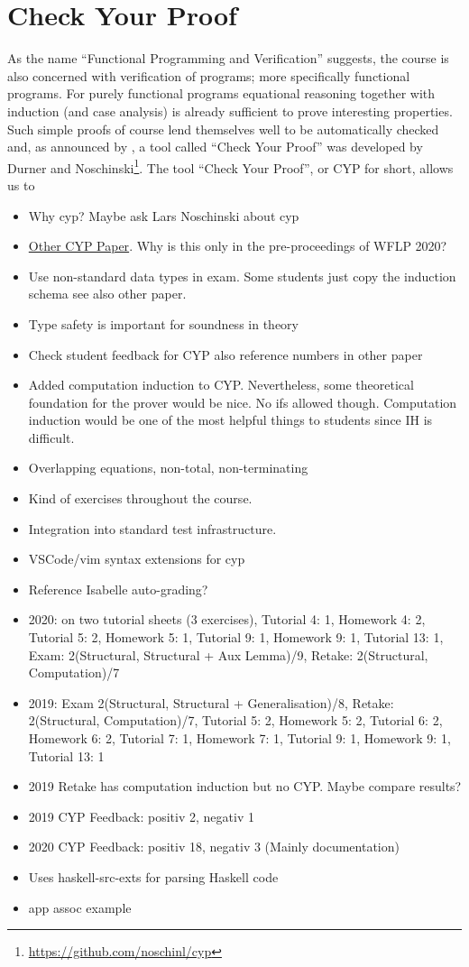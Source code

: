 \section{Check Your Proof}
As the name ``Functional Programming and Verification'' suggests, the course is also concerned with verification of programs; more specifically functional programs.
For purely functional programs equational reasoning together with induction (and case analysis) is already sufficient to prove interesting properties.
Such simple proofs of course lend themselves well to be automatically checked and, as announced by \citet{next_1100}, a tool called ``Check Your Proof'' was developed by Durner and Noschinski\footnote{\url{https://github.com/noschinl/cyp}}.
The tool ``Check Your Proof'', or CYP for short, allows us to 

\begin{itemize}
  \item Why cyp? Maybe ask Lars Noschinski about cyp
  \item \href{https://arxiv.org/pdf/2009.01326.pdf}{Other CYP Paper}. Why is this only in the pre-proceedings of WFLP 2020?
  \item Use non-standard data types in exam. Some students just copy the induction schema see also other paper.
  \item Type safety is important for soundness in theory 
  \item Check student feedback for CYP also reference numbers in other paper
  \item Added computation induction to CYP. Nevertheless, some theoretical foundation for the prover would be nice. No ifs allowed though. Computation induction would be one of the most helpful things to students since IH is difficult.
  \item Overlapping equations, non-total, non-terminating
  \item Kind of exercises throughout the course.
  \item Integration into standard test infrastructure.
  \item VSCode/vim syntax extensions for cyp
  \item Reference Isabelle auto-grading?
  \item 2020: on two tutorial sheets (3 exercises), Tutorial 4: 1, Homework 4: 2, Tutorial 5: 2, Homework 5: 1, Tutorial 9: 1, Homework 9: 1, Tutorial 13: 1, Exam: 2(Structural, Structural + Aux Lemma)/9, Retake: 2(Structural, Computation)/7
  \item 2019: Exam 2(Structural, Structural + Generalisation)/8, Retake: 2(Structural, Computation)/7, Tutorial 5: 2, Homework 5: 2, Tutorial 6: 2, Homework 6: 2, Tutorial 7: 1, Homework 7: 1, Tutorial 9: 1, Homework 9: 1, Tutorial 13: 1 
  \item 2019 Retake has computation induction but no CYP. Maybe compare results?
  \item 2019 CYP Feedback: positiv 2, negativ 1 
  \item 2020 CYP Feedback: positiv 18, negativ 3 (Mainly documentation)
  \item Uses haskell-src-exts for parsing Haskell code
  \item app assoc example
\end{itemize}
